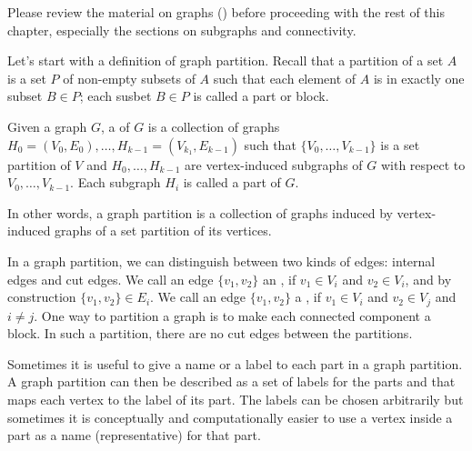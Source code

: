 {%


\begin{notesonly}
  Please review the material on graphs () before
  proceeding with the rest of this chapter, especially the sections on
  subgraphs and connectivity.
\end{notesonly}

Let's start with a definition of graph partition.
%
Recall that a partition of a set $A$ is a set $P$ of non-empty subsets
of $A$ such that each element of $A$ is in exactly one subset $B \in
P$; each susbet $B \in P$ is called a part or block.
%

\begin{definition}
Given a graph $G$, 
%
a  of $G$ is a collection of graphs 
%
$H_0 = (V_0, E_0), \ldots, H_{k-1} = (V_{k_1}, E_{k-1})$
%
such that 
%
%
$\{V_0, \ldots, V_{k-1}\}$ is a set partition of $V$
and 
%
$H_0, \ldots, H_{k-1}$ 
%
are vertex-induced subgraphs of $G$ with respect to $V_0, \ldots, V_{k-1}$.
%
Each subgraph $H_i$ is called a part of $G$.
\end{definition}
%
In other words, a graph partition is a collection of graphs induced by
vertex-induced graphs of a  set partition of its vertices. 


In a graph partition, we can distinguish between two kinds of edges:
internal edges and cut edges. 
%
We call an edge $\{v_1,v_2\}$ an , if $v_1\in V_i$
and $v_2 \in V_i$, and by construction $\{v_1,v_2\} \in E_i$.
%
We call an edge $\{v_1,v_2\}$ a , if $v_1\in V_i$
and $v_2 \in V_j$  and $i \not= j$.
%
One way to partition a graph is to make each connected component a
block. In such a partition, there are no cut edges between the
partitions.

Sometimes it is useful to give a name or a label to each part in a
graph partition.  
%
A graph partition can then be described as a set of labels for the
parts and  that maps each vertex to the label of
its part.  
%
The labels can be chosen arbitrarily but sometimes it is conceptually
and computationally easier to use a vertex inside a part as a name
(representative) for that part.
%


}

